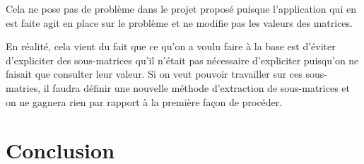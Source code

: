 \documentclass[a4paper,11pt]{article}
\begin{document}
Cela ne pose pas de problème dans le projet proposé puisque l'application qui en est faite agit en place sur le problème et ne modifie pas les valeurs des matrices.

En réalité, cela vient du fait que ce qu'on a voulu faire à la base est d'éviter d'expliciter des sous-matrices qu'il n'était pas nécessaire d'expliciter puisqu'on ne faisait que consulter leur valeur. Si on veut pouvoir travailler sur ces sous-matries, il faudra définir une nouvelle méthode d'extraction de sous-matrices et on ne gagnera rien par rapport à la première façon de procéder.

\section*{Conclusion}
\end{document}
